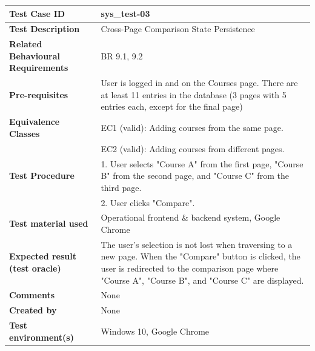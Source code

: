 
\begin{table}[h]
\small
\renewcommand{\arraystretch}{1.1}
\begin{tabularx}{\linewidth}{>{\bfseries}l X}
\hline
Test Case ID & sys\_test-03 \\ \hline
Test Description & Cross-Page Comparison State Persistence \\ \hline
Related Behavioural Requirements & BR 9.1, 9.2 \\ \hline
Pre-requisites & User is logged in and on the Courses page. There are at least 11 entries in the database (3 pages with 5 entries each, except for the final page)\\ \hline
Equivalence Classes & EC1 (valid): Adding courses from the same page. \\ & EC2 (valid): Adding courses from different pages. \\ \hline
Test Procedure & 1. User selects "Course A" from the first page, "Course B" from the second page, and "Course C" from the third page.\\ & 2. User clicks "Compare". \\ \hline
Test material used & Operational frontend \& backend system, Google Chrome \\ \hline
Expected result (test oracle) & The user's selection is not lost when traversing to a new page. When the "Compare" button is clicked, the user is redirected to the comparison page where "Course A", "Course B", and "Course C" are displayed. \\ \hline
Comments & None \\ \hline
Created by & None \\ \hline
Test environment(s) & Windows 10, Google Chrome \\ \hline
\end{tabularx}
\end{table}

